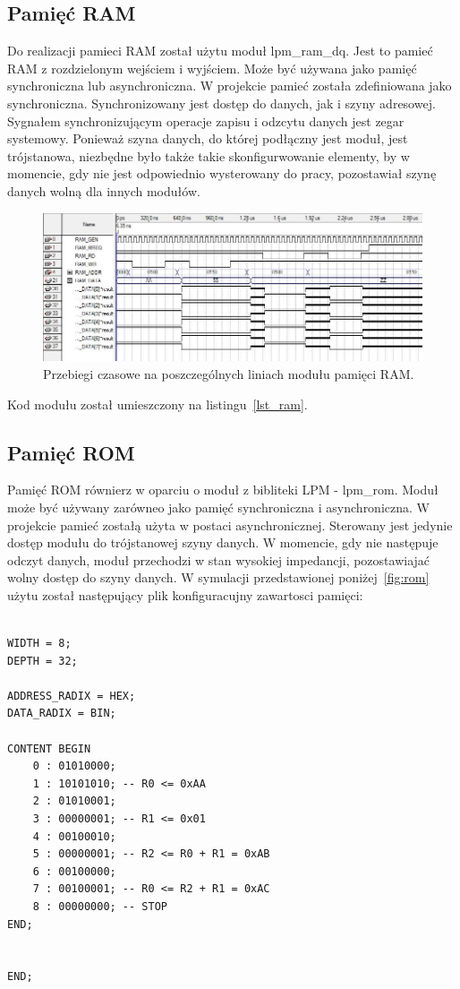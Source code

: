 \documentclass[a4paper,12pt]{report}
\begin{document}
\subsection{Pamięć RAM}
Do realizacji pamieci RAM został użytu moduł lpm\_ram\_dq. Jest to pamieć RAM z rozdzielonym wejściem i wyjściem. Może być używana jako pamięć synchroniczna lub asynchroniczna. W projekcie pamieć została zdefiniowana jako synchroniczna. Synchronizowany jest dostęp do danych, jak i szyny adresowej. Sygnałem synchronizującym operacje zapisu i odzcytu danych jest zegar systemowy. Ponieważ szyna danych, do której podłączny jest moduł, jest trójstanowa, niezbędne było także takie skonfigurwowanie elementy, by w momencie, gdy nie jest odpowiednio wysterowany do pracy, pozostawiał szynę danych wolną dla innych modułów.

\begin{figure}[h]
\centering
\includegraphics[width=15cm]{./pict/ram.jpg}
\caption{Przebiegi czasowe na poszczególnych liniach modułu pamięci RAM.}
\label{fig:ram}
\end{figure}

Kod modułu został umieszczony na listingu~\ref{lst_ram}.

\subsection{Pamięć ROM}
Pamięć ROM równierz w oparciu o moduł z bibliteki LPM - lpm\_rom. Moduł może być używany zarówneo  jako pamięć synchroniczna i asynchroniczna. W projekcie pamieć zostałą użyta w postaci asynchronicznej. Sterowany jest jedynie dostęp modułu do trójstanowej szyny danych. W momencie, gdy nie następuje odczyt danych, moduł przechodzi w stan wysokiej impedancji, pozostawiajać wolny dostęp do szyny danych.
W symulacji przedstawionej poniżej~\ref{fig:rom} użytu został następujący plik konfiguracujny zawartosci pamięci:

\begin{lstlisting}[caption=Plik źródłowy dla symulacji~\ref{fig:rom},language=ahdl]

WIDTH = 8;
DEPTH = 32;

ADDRESS_RADIX = HEX;
DATA_RADIX = BIN;

CONTENT BEGIN
	0 : 01010000;
	1 : 10101010; -- R0 <= 0xAA
	2 : 01010001;
	3 : 00000001; -- R1 <= 0x01
	4 : 00100010;
	5 : 00000001; -- R2 <= R0 + R1 = 0xAB
	6 : 00100000;
	7 : 00100001; -- R0 <= R2 + R1 = 0xAC
	8 : 00000000; -- STOP
END;


END;
\end{lstlisting}
\lstset{
tabsize=4
}
\end{document}
